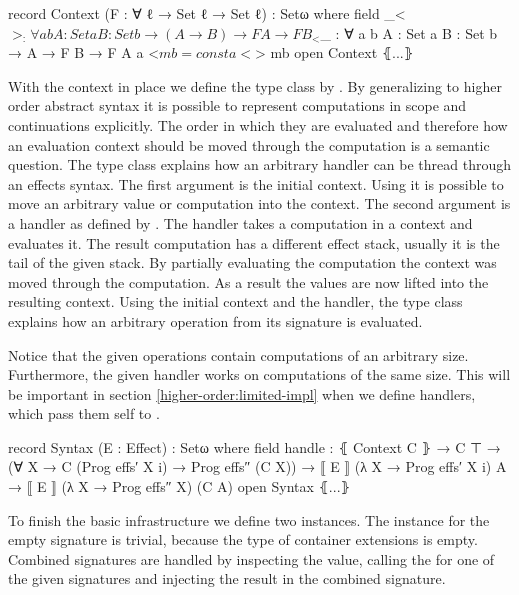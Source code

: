 \begin{code}
record Context (F : ∀ {ℓ} → Set ℓ → Set ℓ) : Setω where
  field _<$>_ : ∀ {a b} {A : Set a} {B : Set b} → (A → B) → F A → F B
  _<$_ : ∀ {a b} {A : Set a} {B : Set b} → A → F B → F A
  a <$ mb = const a <$> mb
open Context ⦃...⦄
\end{code}
With the context in place we define the  type class by
\citeauthor{DBLP:conf/haskell/WuSH14}.
By generalizing to higher order abstract syntax it is possible to represent
computations in scope and continuations explicitly.
The order in which they are evaluated and therefore how an evaluation context
should be moved through the computation is a semantic question.
The type class explains how an arbitrary handler can be thread through an
effects syntax.
The first argument is the initial context.
Using \AgdaFunction{<\$} it is possible to move an arbitrary value or
computation into the context.
The second argument is a handler as defined by
\citeauthor{DBLP:conf/haskell/WuSH14}.
The handler takes a computation in a context and evaluates it.
The result computation has a different effect stack, usually it is the tail of
the given stack.
By partially evaluating the computation the context was moved through the
computation.
As a result the values are now lifted into the resulting context.
Using the initial context and the handler, the type class explains how an
arbitrary operation from its signature is evaluated.

Notice that the given operations contain computations of an arbitrary size.
Furthermore, the given handler works on computations of the same size.
This will be important in section \ref{higher-order:limited-impl} when we define
handlers, which pass them self to .

\begin{code}
record Syntax (E : Effect) : Setω where
  field handle : ⦃ Context C ⦄ → C ⊤ →
          (∀ {X} → C (Prog effs′ X {i}) → Prog effs″ (C X)) →
          ⟦ E ⟧ (λ X → Prog effs′ X {i}) A → ⟦ E ⟧ (λ X → Prog effs″ X) (C A)
open Syntax ⦃...⦄
\end{code}
To finish the basic infrastructure we define two 
instances.
The instance for the empty signature  is trivial, because the
type of container extensions is empty.
Combined signatures are handled by inspecting the value, calling the
 for one of the given signatures and injecting the result
in the combined signature.

